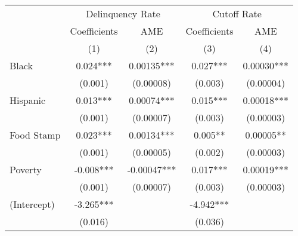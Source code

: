 \begin{tabular}{lcccc}
\toprule 
\midrule 
 & \multicolumn{2}{c}{Delinquency Rate} & \multicolumn{2}{c}{Cutoff Rate} \\
 \cmidrule(lr){2-3} \cmidrule(lr){4-5} 
 & Coefficients & AME & Coefficients & AME \\
 & (1) & (2) & (3) & (4) \\
\midrule 
Black & 0.024*** & 0.00135*** & 0.027*** & 0.00030*** \\
 & (0.001) & (0.00008) & (0.003) & (0.00004) \\
Hispanic & 0.013*** & 0.00074*** & 0.015*** & 0.00018*** \\
 & (0.001) & (0.00007) & (0.003) & (0.00003) \\
Food Stamp & 0.023*** & 0.00134*** & 0.005** & 0.00005** \\
 & (0.001) & (0.00005) & (0.002) & (0.00003) \\
Poverty & -0.008*** & -0.00047*** & 0.017*** & 0.00019*** \\
 & (0.001) & (0.00007) & (0.003) & (0.00003) \\
(Intercept) & -3.265*** &  & -4.942*** &  \\
 & (0.016) &  & (0.036) &  \\
\midrule 
\bottomrule 
\end{tabular}
